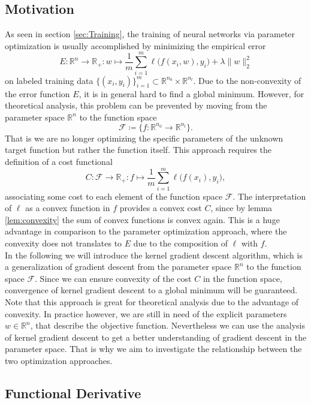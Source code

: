\documentclass[11pt, a4paper]{article}
\newcommand{\R}{\mathbb{R}}
\newcommand{\F}{\mathcal{F}}
\begin{document}
\subsection{Motivation}

As seen in section \ref{sec:Training}, the training of neural networks via parameter optimization is usually accomplished by minimizing the empirical error
\[ E : \R^n \to \R_+ : w \mapsto \frac{1}{m} \sum_{i=1}^{m} \ell \big ( f(x_i,w),y_i \big) + \lambda \big \| w \big \|_2^2 \]
on labeled training data $\{ (x_i,y_i) \}_{i=1}^m \subset \R^{n_0} \times \R^{n_l}$. Due to the non-convexity of the error function $E$, it is in general hard to find a global minimum. However, for theoretical analysis, this problem can be prevented by moving from the parameter space $\R^n$ to the function space
\[ \F \coloneq \Big \{ f: \R^{n_0} \to \R^{n_l} \Big \}. \]
That is we are no longer optimizing the specific parameters of the unknown target function but rather the function itself. This approach requires the definition of a cost functional
\[ C: \F \to \R_+ : f \mapsto \frac{1}{m} \sum_{i=1}^{m} \ell \big ( f(x_i),y_i \big), \]
associating some cost to each element of the function space $\F$. The interpretation of $\ell$ as a convex function in $f$ provides a convex cost $C$, since by lemma \ref{lem:convexity} the sum of convex functions is convex again. This is a huge advantage in comparison to the parameter optimization approach, where the convexity does not translates to $E$ due to the composition of $\ell$ with $f$. \\

In the following we will introduce the kernel gradient descent algorithm, which is a generalization of gradient descent from the parameter space $\R^n$ to the function space $\F$. Since we can ensure convexity of the cost $C$ in the function space, convergence of kernel gradient descent to a global minimum will be guaranteed. \\

Note that this approach is great for theoretical analysis due to the advantage of convexity. In practice however, we are still in need of the explicit parameters $w \in \R^n$, that describe the objective function. Nevertheless we can use the analysis of kernel gradient descent to get a better understanding of gradient descent in the parameter space. That is why we aim to investigate the relationship between the two optimization approaches.


\subsection{Functional Derivative}
\end{document}
